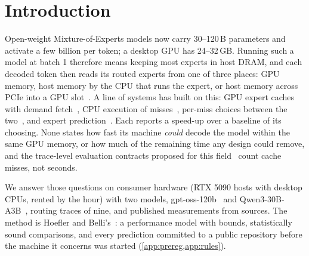 \documentclass[10pt,twocolumn]{article}
\begin{document}
\begin{abstract}
\ftLeadGptMin--\ftLeadGptMax\% and Qwen3-30B-A3B \ftLeadQwenMin--\ftLeadQwenMax\% faster than FreeToken at equal GPU
memory on the headline machine, \scLeadGptMin--\scLeadGptMax\% and \scLeadQwenMin{} to \scLeadQwenMax\% on a second host
whose CPU is \scCpuBwDrop\% slower, and \slFtMin--\slFtMax$\times$ FreeToken behind a link of half the bandwidth: the
lead is the CPU path, and on gpt-oss it grows with the host's CPU-to-link ratio. It runs
\llamaXMin--\llamaXMax$\times$ llama.cpp on the headline machine (\scLlamaXMin--\scLlamaXMax$\times$ on the second),
with the gain attributed by ablation and the policy's share measured again on the second host.
Every prediction was committed before the measurement it predicts; \scClauses{} clauses are scored in the appendix.
\end{abstract}

\section{Introduction}
Open-weight Mixture-of-Experts models now carry 30--120\,B parameters and activate a few billion per token; a desktop
GPU has 24--32\,GB. Running such a model at batch 1 therefore means keeping most experts in host DRAM, and each
decoded token then reads its routed experts from one of three places: GPU memory, host memory by the CPU that runs the
expert, or host memory across PCIe into a GPU slot~\cite{ivanov2021datamovement,hoefler2021sparsity}. A line of
systems has built on this: GPU expert caches with demand fetch~\cite{eliseev2023offloading,xue2024moeinfinity,song2024promoe},
CPU execution of misses~\cite{kamahori2024fiddler,ktransformers,zhong2025hybrimoe,huang2025cpugpu,daop2025,dali2026},
per-miss choices between the two~\cite{freetoken}, and expert prediction~\cite{hwang2024pregated,zhu2025preattention,wang2026seqmoe}.
Each reports a speed-up over a baseline of its choosing. None states how fast its machine \emph{could} decode the model
within the same GPU memory, or how much of the remaining time any design could remove, and the trace-level evaluation
contracts proposed for this field~\cite{zhang2026reproducible} count cache misses, not seconds.

We answer those questions on consumer hardware (RTX 5090 hosts with desktop CPUs, rented by the hour) with two
models, gpt-oss-120b~\cite{openai2025gptoss} and Qwen3-30B-A3B~\cite{yang2025qwen3}, routing traces of nine, and
\audAllN{} published measurements from \audSources{} sources. The method is Hoefler and Belli's~\cite{hoefler2015benchmarking}: a
performance model with bounds, statistically sound comparisons, and every prediction committed to a public
repository before the machine it concerns was started (\cref{app:prereg,app:rules}).
\end{document}
